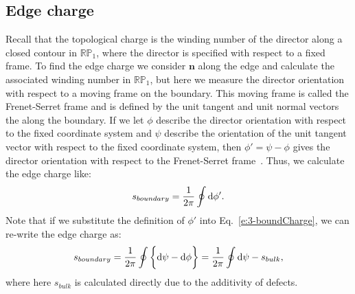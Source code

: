 \subsection{Edge charge}
Recall that the topological charge is the winding number of the director along a closed contour in $\mathbb{R}\mathbb{P}_1$, where the director is specified with respect to a fixed frame.
To find the edge charge we consider $\mathbf{n}$ along the edge and calculate the associated winding number in $\mathbb{R}\mathbb{P}_1$, but here we measure the director orientation with respect to a moving frame on the boundary.
This moving frame is called the Frenet-Serret frame and is defined by the unit tangent and unit normal vectors the along the boundary.
If we let $\phi$ describe the director orientation with respect to the fixed coordinate system and $\psi$ describe the orientation of the unit tangent vector with respect to the fixed coordinate system, then $\phi' = \psi-\phi$ gives the director orientation with respect to the Frenet-Serret frame~\cite{RN35,RN23}.
Thus, we calculate the edge charge like:
\begin{equation}
  s_{boundary} = \frac{1}{2\pi} \oint \textup{d}\phi'\label{e:3-boundCharge}.
\end{equation}
Note that if we substitute the definition of $\phi'$ into Eq.~\ref{e:3-boundCharge}, we can re-write the edge charge as:
\begin{equation}
  s_{boundary} = \frac{1}{2\pi} \oint \bigg \{ \textup{d}\psi - \textup{d}\phi \bigg \} = \frac{1}{2\pi} \oint \textup{d}\psi - s_{bulk}\label{e:3-boundChargeExpand},
\end{equation}
where here $s_{bulk}$ is calculated directly due to the additivity of defects.

